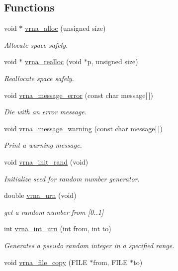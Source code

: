 \subsection*{Functions}
\begin{DoxyCompactItemize}
\item 
void $\ast$ \hyperlink{group__utils_gaf37a0979367c977edfb9da6614eebe99}{vrna\+\_\+alloc} (unsigned size)
\begin{DoxyCompactList}\small\item\em Allocate space safely. \end{DoxyCompactList}\item 
void $\ast$ \hyperlink{group__utils_ga27f4719a66c6f90d1cca3d1e6e696c6a}{vrna\+\_\+realloc} (void $\ast$p, unsigned size)
\begin{DoxyCompactList}\small\item\em Reallocate space safely. \end{DoxyCompactList}\item 
void \hyperlink{group__utils_gabb76f8f8dbd652fa4a24037cf4524373}{vrna\+\_\+message\+\_\+error} (const char message\mbox{[}$\,$\mbox{]})
\begin{DoxyCompactList}\small\item\em Die with an error message. \end{DoxyCompactList}\item 
void \hyperlink{group__utils_gafe4072406bd287c6857763dd7d2fe1f1}{vrna\+\_\+message\+\_\+warning} (const char message\mbox{[}$\,$\mbox{]})
\begin{DoxyCompactList}\small\item\em Print a warning message. \end{DoxyCompactList}\item 
void \hyperlink{group__utils_ga0ad1f40ea316e5c5918695c35613027a}{vrna\+\_\+init\+\_\+rand} (void)\hypertarget{group__utils_ga0ad1f40ea316e5c5918695c35613027a}{}\label{group__utils_ga0ad1f40ea316e5c5918695c35613027a}

\begin{DoxyCompactList}\small\item\em Initialize seed for random number generator. \end{DoxyCompactList}\item 
double \hyperlink{group__utils_ga384e256ebb295d04a14426179db0dd6e}{vrna\+\_\+urn} (void)
\begin{DoxyCompactList}\small\item\em get a random number from \mbox{[}0..1\mbox{]} \end{DoxyCompactList}\item 
int \hyperlink{group__utils_ga46111bb3747dbcf4609f0d40ae169ad9}{vrna\+\_\+int\+\_\+urn} (int from, int to)
\begin{DoxyCompactList}\small\item\em Generates a pseudo random integer in a specified range. \end{DoxyCompactList}\item 
void \hyperlink{group__utils_ga4382a56d2fee9ed738364b99329edc7c}{vrna\+\_\+file\+\_\+copy} (F\+I\+LE $\ast$from, F\+I\+LE $\ast$to)\hypertarget{group__utils_ga4382a56d2fee9ed738364b99329edc7c}{}\label{group__utils_ga4382a56d2fee9ed738364b99329edc7c}


\end{DoxyCompactItemize}
